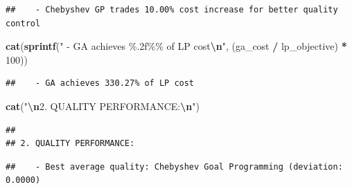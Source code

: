 \documentclass[
]{article}
\newenvironment{Shaded}{\begin{snugshade}}{\end{snugshade}}
\newcommand{\DecValTok}[1]{\textcolor[rgb]{0.00,0.00,0.81}{#1}}
\newcommand{\FunctionTok}[1]{\textcolor[rgb]{0.13,0.29,0.53}{\textbf{#1}}}
\newcommand{\NormalTok}[1]{#1}
\newcommand{\OtherTok}[1]{\textcolor[rgb]{0.56,0.35,0.01}{#1}}
\newcommand{\SpecialCharTok}[1]{\textcolor[rgb]{0.81,0.36,0.00}{\textbf{#1}}}
\newcommand{\StringTok}[1]{\textcolor[rgb]{0.31,0.60,0.02}{#1}}
\begin{document}
\begin{verbatim}
##    - Chebyshev GP trades 10.00% cost increase for better quality control
\end{verbatim}

\begin{Shaded}
\begin{Highlighting}[]
\FunctionTok{cat}\NormalTok{(}\FunctionTok{sprintf}\NormalTok{(}\StringTok{"   {-} GA achieves \%.2f\%\% of LP cost}\SpecialCharTok{\textbackslash{}n}\StringTok{"}\NormalTok{, (ga\_cost }\SpecialCharTok{/}\NormalTok{ lp\_objective) }\SpecialCharTok{*} \DecValTok{100}\NormalTok{))}
\end{Highlighting}
\end{Shaded}

\begin{verbatim}
##    - GA achieves 330.27% of LP cost
\end{verbatim}

\begin{Shaded}
\begin{Highlighting}[]
\FunctionTok{cat}\NormalTok{(}\StringTok{"}\SpecialCharTok{\textbackslash{}n}\StringTok{2. QUALITY PERFORMANCE:}\SpecialCharTok{\textbackslash{}n}\StringTok{"}\NormalTok{)}
\end{Highlighting}
\end{Shaded}

\begin{verbatim}
## 
## 2. QUALITY PERFORMANCE:
\end{verbatim}

\begin{Shaded}
\end{Shaded}

\begin{verbatim}
##    - Best average quality: Chebyshev Goal Programming (deviation: 0.0000)
\end{verbatim}
\end{document}
